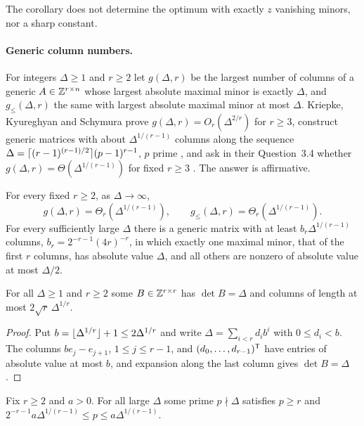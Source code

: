The corollary does not determine the optimum with exactly $z$ vanishing minors, nor a sharp constant.

\paragraph{Generic column numbers.} For integers $\Delta\ge1$ and $r\ge2$ let $g(\Delta,r)$ be the largest
number of columns of a generic $A\in\mathbb{Z}^{r\times n}$ whose largest absolute maximal minor is exactly $\Delta$,
and $g_\le(\Delta,r)$ the same with largest absolute maximal minor at most $\Delta$. Kriepke, Kyureghyan and
Schymura prove $g(\Delta,r)=O_r(\Delta^{2/r})$ for $r\ge3$, construct generic matrices with about
$\Delta^{1/(r-1)}$ columns along the sequence $\Delta=\lceil(r-1)^{(r-1)/2}\rceil(p-1)^{r-1}$, $p$ prime
\cite[Proposition~3.3]{KriepkeKyureghyanSchymura2023Size}, and ask in their Question~3.4 whether $g(\Delta,r)=\Theta(\Delta^{1/(r-1)})$
for fixed $r\ge3$ \cite{KriepkeKyureghyanSchymura2023Size}. The answer is affirmative.

\begin{theorem}\label{spn:thm:gramcolumn}
For every fixed $r\ge2$, as $\Delta\to\infty$,
\[
 g(\Delta,r)=\Theta_r(\Delta^{1/(r-1)}),\qquad g_\le(\Delta,r)=\Theta_r(\Delta^{1/(r-1)}).
\]
For every sufficiently large $\Delta$ there is a generic matrix with at least $b_r\Delta^{1/(r-1)}$ columns,
$b_r=2^{-r-1}(4r)^{-r}$, in which exactly one maximal minor, that of the first $r$ columns, has absolute value
$\Delta$, and all others are nonzero of absolute value at most $\Delta/2$.
\end{theorem}

\begin{lemma}\label{spn:lem:gramanchor}
For all $\Delta\ge1$ and $r\ge2$ some $B\in\mathbb{Z}^{r\times r}$ has $\det B=\Delta$ and columns of length at most
$2\sqrt r\,\Delta^{1/r}$.
\end{lemma}

\begin{proof}
Put $b=\lfloor\Delta^{1/r}\rfloor+1\le2\Delta^{1/r}$ and write $\Delta=\sum_{i<r}d_ib^i$ with $0\le d_i<b$. The columns
$be_j-e_{j+1}$, $1\le j\le r-1$, and $(d_0,\dots,d_{r-1})^{\mathsf{T}}$ have entries of absolute value at most $b$, and
expansion along the last column gives $\det B=\Delta$.
\end{proof}

\begin{lemma}\label{spn:lem:gramprime}
Fix $r\ge2$ and $a>0$. For all large $\Delta$ some prime $p\nmid\Delta$ satisfies $p\ge r$ and
$2^{-r-1}a\Delta^{1/(r-1)}\le p\le a\Delta^{1/(r-1)}$.
\end{lemma}

